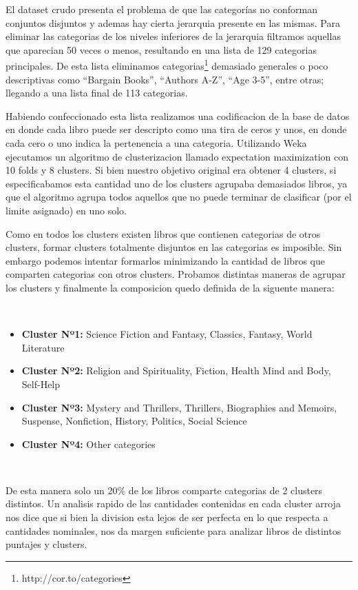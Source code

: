 \documentclass[12pt,journal,compsoc]{IEEEtran}
\begin{document}
El dataset crudo presenta el problema de que las categorías no conforman conjuntos disjuntos y ademas hay cierta jerarquia presente en las mismas. Para eliminar las categorias de los niveles inferiores de la jerarquia filtramos aquellas que aparecian 50 veces o menos, resultando en una lista de 129 categorias principales. De esta lista eliminamos categorias\footnote{http://cor.to/categories} demasiado generales o poco descriptivas como ``Bargain Books'', ``Authors A-Z'', ``Age 3-5'', entre otras; llegando a una lista final de 113 categorias.


Habiendo confeccionado esta lista realizamos una codificacion de la base de datos en donde cada libro puede ser descripto como una tira de ceros y unos, en donde cada cero o uno indica la pertenencia a una categoria. Utilizando Weka ejecutamos un algoritmo de clusterizacion llamado expectation maximization con 10 folds y 8 clusters. Si bien nuestro objetivo original era obtener 4 clusters, si especificabamos esta cantidad uno de los clusters agrupaba demasiados libros, ya que el algoritmo agrupa todos aquellos que no puede terminar de clasificar (por el limite asignado) en uno solo.

Como en todos los clusters existen libros que contienen categorias de otros clusters, formar clusters totalmente disjuntos en las categorias es imposible. Sin embargo podemos intentar formarlos minimizando la cantidad de libros que comparten categorias con otros clusters. Probamos distintas maneras de agrupar los clusters y finalmente la composicion quedo definida de la siguente manera:

~

\begin{itemize}
\item \textbf{Cluster Nº1:} Science Fiction and Fantasy, Classics, Fantasy, World Literature
\item \textbf{Cluster Nº2:} Religion and Spirituality, Fiction, Health Mind and Body, Self-Help
\item \textbf{Cluster Nº3:} Mystery and Thrillers, Thrillers, Biographies and Memoirs, Suspense, Nonfiction, History, Politics, Social Science
\item \textbf{Cluster Nº4:} Other categories
\end{itemize}

~

De esta manera solo un 20\% de los libros comparte categorias de 2 clusters distintos. Un analisis rapido de las cantidades contenidas en cada cluster arroja nos dice que si bien la division esta lejos de ser perfecta en lo que respecta a cantidades nominales, nos da margen suficiente para analizar libros de distintos puntajes y clusters.
\end{document}
